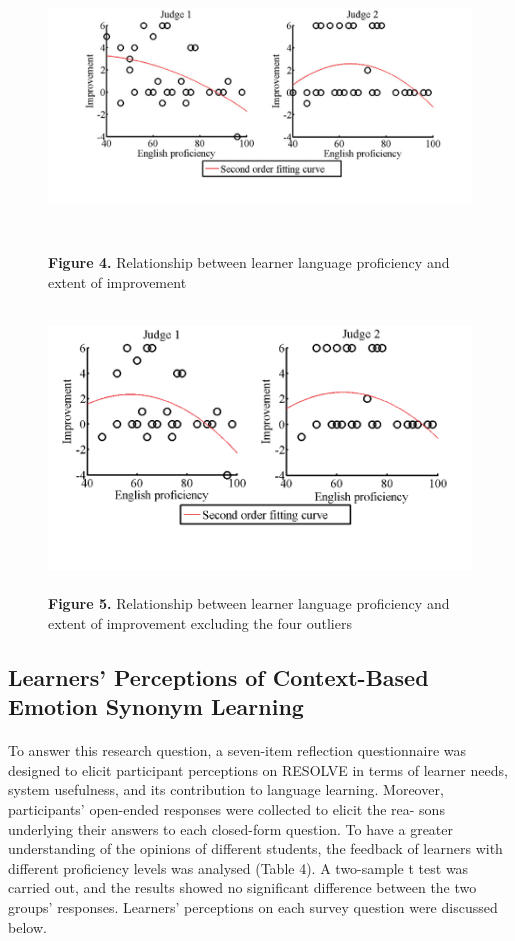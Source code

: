 \documentclass[a4paper,12pt,oneside]{article}
\let\counterwithin\relax
\begin{document}
\begin{figure}[H]
\includegraphics[height=7.5cm,width=16cm]{Figure4.png}
\centering
\caption{\textbf{Figure 4.} Relationship between learner language proficiency and extent of improvement}
\end{figure}


\begin{figure}[H]
\includegraphics[height=7.5cm,width=16cm]{Figure5.png}
\centering
\caption{\textbf{Figure 5.} Relationship between learner language proficiency and extent of improvement excluding the four outliers}
\end{figure}

\subsection{Learners’ Perceptions of Context-Based Emotion Synonym Learning}
\paragraph{}
To answer this research question, a seven-item reflection questionnaire was designed to elicit participant perceptions on RESOLVE in terms of learner needs, system usefulness, and its contribution to language learning. Moreover, participants’ open-ended responses were collected to elicit the rea- sons underlying their answers to each closed-form question. To have a greater understanding of the opinions of different students, the feedback of learners with different proficiency levels was analysed (Table 4). A two-sample t test was carried out, and the results showed no significant difference between the two groups’ responses. Learners’ perceptions on each survey question were discussed below. 
\end{document}

